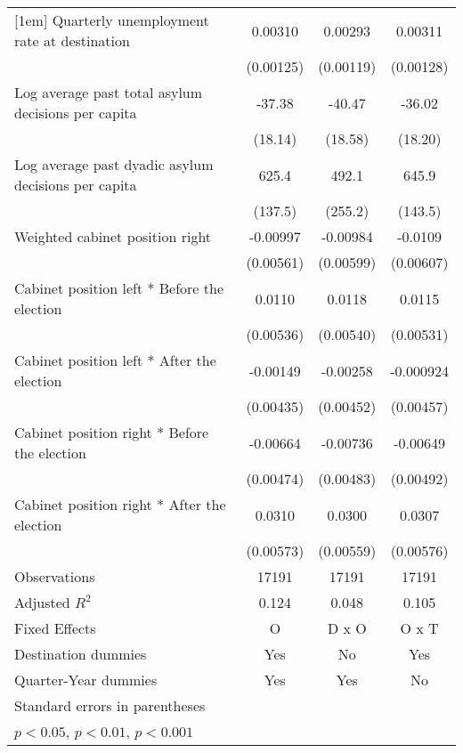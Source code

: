 \begin{table}[htbp]
\begin{tabular}{l*{3}{c}}
[1em]
Quarterly unemployment rate at destination&     0.00310\sym{*}  &     0.00293\sym{*}  &     0.00311\sym{*}  \\
                    &   (0.00125)         &   (0.00119)         &   (0.00128)         \\
[1em]
Log average past total asylum decisions per capita&      -37.38\sym{*}  &      -40.47\sym{*}  &      -36.02         \\
                    &     (18.14)         &     (18.58)         &     (18.20)         \\
[1em]
Log average past dyadic asylum decisions per capita&       625.4\sym{***}&       492.1         &       645.9\sym{***}\\
                    &     (137.5)         &     (255.2)         &     (143.5)         \\
[1em]
Weighted cabinet position right&    -0.00997         &    -0.00984         &     -0.0109         \\
                    &   (0.00561)         &   (0.00599)         &   (0.00607)         \\
[1em]
Cabinet position left * Before the election&      0.0110\sym{*}  &      0.0118\sym{*}  &      0.0115\sym{*}  \\
                    &   (0.00536)         &   (0.00540)         &   (0.00531)         \\
[1em]
Cabinet position left * After the election&    -0.00149         &    -0.00258         &   -0.000924         \\
                    &   (0.00435)         &   (0.00452)         &   (0.00457)         \\
[1em]
Cabinet position right * Before the election&    -0.00664         &    -0.00736         &    -0.00649         \\
                    &   (0.00474)         &   (0.00483)         &   (0.00492)         \\
[1em]
Cabinet position right * After the election&      0.0310\sym{***}&      0.0300\sym{***}&      0.0307\sym{***}\\
                    &   (0.00573)         &   (0.00559)         &   (0.00576)         \\
\hline
Observations        &       17191         &       17191         &       17191         \\
Adjusted \(R^{2}\)  &       0.124         &       0.048         &       0.105         \\
Fixed Effects       &           O         &       D x O         &       O x T         \\
Destination dummies &         Yes         &          No         &         Yes         \\
Quarter-Year dummies&         Yes         &         Yes         &          No         \\
\hline\hline
\multicolumn{4}{l}{\footnotesize Standard errors in parentheses}\\
\multicolumn{4}{l}{\footnotesize \sym{*} \(p<0.05\), \sym{**} \(p<0.01\), \sym{***} \(p<0.001\)}\\
\end{tabular}
\end{table}
